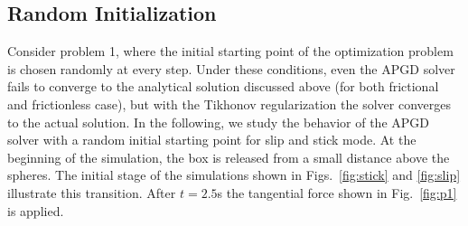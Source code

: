 \subsection{Random Initialization}
Consider problem 1, where the initial starting point of the optimization problem is chosen randomly at every step.
Under these conditions, even the APGD solver fails to converge to the analytical solution discussed above (for both frictional and frictionless case), but with the Tikhonov regularization the solver converges to the actual solution. In the following, we study the behavior of the APGD solver with a random initial starting point for slip and stick mode. 
At the beginning of the simulation, the box is released from a small distance above the spheres. The initial stage of the simulations shown in Figs.~\ref{fig:stick} and \ref{fig:slip} illustrate this transition. After $t=2.5$\si{s} the tangential force shown in Fig.~\ref{fig:p1} is applied.
